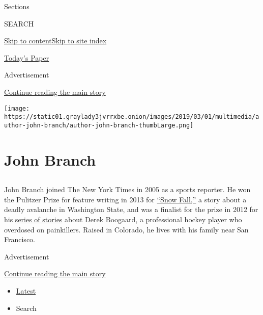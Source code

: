 Sections

SEARCH

\protect\hyperlink{site-content}{Skip to
content}\protect\hyperlink{site-index}{Skip to site index}

\href{https://myaccount.nytimes3xbfgragh.onion/auth/login?response_type=cookie\&client_id=vi}{}

\href{https://www.nytimes3xbfgragh.onion/section/todayspaper}{Today's
Paper}

Advertisement

\protect\hyperlink{after-top}{Continue reading the main story}

\texttt{[image: https://static01.graylady3jvrrxbe.onion/images/2019/03/01/multimedia/author-john-branch/author-john-branch-thumbLarge.png]}

\hypertarget{john-branch}{%
\section{John Branch}\label{john-branch}}

\subsection{}

John Branch joined The New York Times in 2005 as a sports reporter. He
won the Pulitzer Prize for feature writing in 2013 for
\href{http://www.nytimes3xbfgragh.onion/projects/2012/snow-fall/index.html}{``Snow
Fall,''} a story about a deadly avalanche in Washington State, and was a
finalist for the prize in 2012 for his
\href{https://www.nytimes3xbfgragh.onion/2011/12/04/sports/hockey/derek-boogaard-a-boy-learns-to-brawl.html}{series
of stories} about Derek Boogaard, a professional hockey player who
overdosed on painkillers. Raised in Colorado, he lives with his family
near San Francisco.

Advertisement

\protect\hyperlink{after-mid1}{Continue reading the main story}

\begin{itemize}
\tightlist
\item
  \protect\hyperlink{stream-panel}{Latest}
\item
  Search
\end{itemize}


